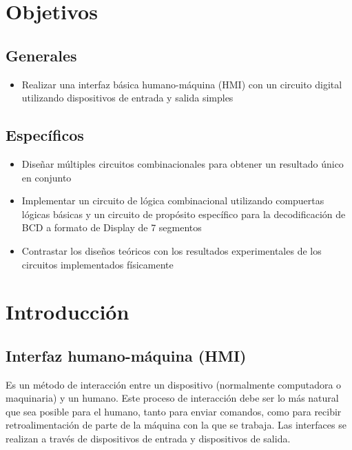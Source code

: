
\section*{Objetivos}
\subsection*{Generales}
\begin{itemize}
    \item Realizar una interfaz básica humano-máquina (HMI) con un circuito digital utilizando dispositivos de entrada y salida simples
\end{itemize}

\subsection*{Específicos}
\begin{itemize}
    \item Diseñar múltiples circuitos combinacionales para obtener un resultado único en conjunto
    \item Implementar un circuito de lógica combinacional utilizando compuertas lógicas básicas y un circuito de propósito específico para la decodificación de BCD a formato de Display de 7 segmentos
    \item Contrastar los diseños teóricos con los resultados experimentales de los circuitos implementados físicamente
\end{itemize}

\section{Introducción}

\subsection{Interfaz humano-máquina (HMI)}
Es un método de interacción entre un dispositivo (normalmente computadora o maquinaria) y un humano. Este proceso de interacción debe ser lo más natural que sea posible para el humano, 
tanto para enviar comandos, como para recibir retroalimentación de parte de la máquina con la que se trabaja. Las interfaces se realizan a través de dispositivos de entrada y dispositivos de salida.

